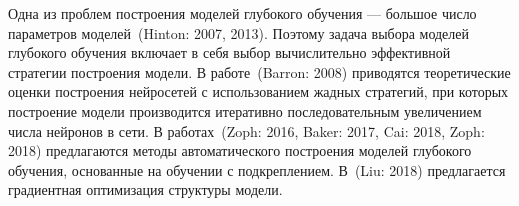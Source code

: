 \documentclass[11pt, a5paper]{dissert}
\theoremstyle{definition}
\begin{document}
Одна из проблем построения моделей глубокого обучения --- большое число параметров моделей~(Hinton: 2007, 2013). Поэтому задача выбора моделей глубокого обучения включает в себя выбор вычислительно эффективной стратегии построения модели. В работе~(Barron: 2008) приводятся теоретические оценки построения нейросетей с использованием жадных стратегий,  при которых построение модели производится итеративно последовательным увеличением числа нейронов в сети. %
В работах~(Zoph: 2016, Baker: 2017, Cai: 2018, Zoph: 2018) предлагаются методы автоматического построения моделей глубокого обучения, основанные на обучении с подкреплением. В~(Liu: 2018) предлагается градиентная оптимизация структуры модели.

\end{document}
